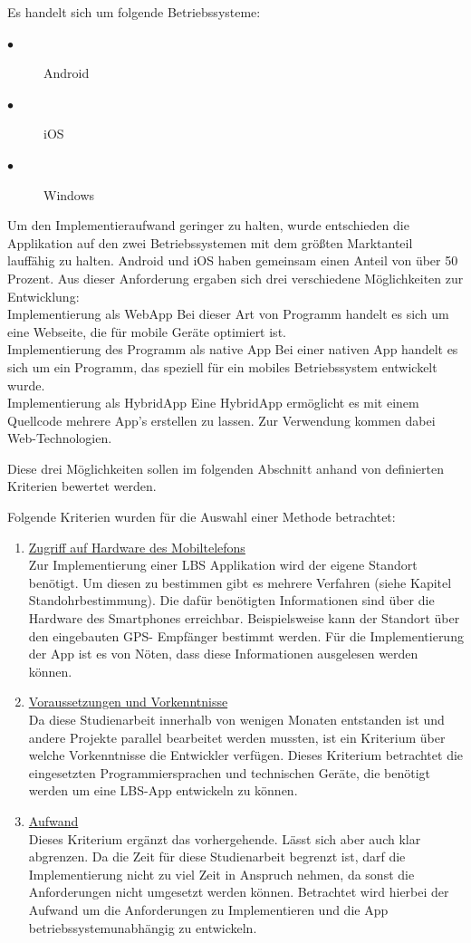 Es handelt sich um folgende Betriebssysteme: 
\begin{description}
  \item[$\bullet$] Android
  \item[$\bullet$] iOS
  \item[$\bullet$] Windows
\end{description}


Um den Implementieraufwand geringer zu halten, wurde entschieden die Applikation auf den zwei Betriebssystemen mit dem größten Marktanteil lauffähig zu halten. 
Android und iOS haben gemeinsam einen Anteil von über 50 Prozent. Aus dieser 
Anforderung ergaben sich drei verschiedene Möglichkeiten zur Entwicklung:
\\Implementierung als WebApp
Bei dieser Art von Programm handelt es sich um eine Webseite, die für mobile 
Geräte optimiert ist.
\\Implementierung des Programm als native App
Bei einer nativen App handelt es sich um ein Programm, das speziell für ein mobiles Betriebssystem entwickelt wurde.
\\Implementierung als HybridApp
Eine HybridApp ermöglicht es mit einem Quellcode mehrere App's erstellen zu lassen. 
Zur Verwendung kommen dabei Web-Technologien.

Diese drei Möglichkeiten sollen im folgenden Abschnitt anhand von definierten 
Kriterien bewertet werden.


Folgende Kriterien wurden für die Auswahl einer Methode betrachtet:
\begin{enumerate}
\item \underline{Zugriff auf Hardware des Mobiltelefons}
\\Zur Implementierung einer LBS Applikation wird der eigene Standort benötigt. Um 
diesen zu bestimmen gibt es mehrere Verfahren (siehe Kapitel Standohrbestimmung). 
Die dafür benötigten Informationen sind über die Hardware des 
Smartphones erreichbar. Beispielsweise kann der Standort über den eingebauten GPS-
Empfänger bestimmt werden. Für die Implementierung der App ist es von Nöten, dass 
diese Informationen ausgelesen werden können.

\item \underline{Voraussetzungen und Vorkenntnisse}
\\Da diese Studienarbeit innerhalb von wenigen Monaten entstanden ist und andere Projekte 
parallel bearbeitet werden mussten, ist ein Kriterium über welche Vorkenntnisse die 
Entwickler verfügen. Dieses Kriterium betrachtet die eingesetzten 
Programmiersprachen und technischen Geräte, die benötigt werden um eine LBS-App 
entwickeln zu können.


\item \underline{Aufwand}
\\Dieses Kriterium ergänzt das vorhergehende. Lässt sich aber auch klar abgrenzen. Da die Zeit für diese Studienarbeit begrenzt ist, darf die Implementierung nicht zu 
viel Zeit in Anspruch nehmen, da sonst die Anforderungen nicht umgesetzt werden 
können. Betrachtet wird hierbei der Aufwand um die Anforderungen zu 
Implementieren und die App betriebssystemunabhängig zu entwickeln.
\end{enumerate}


